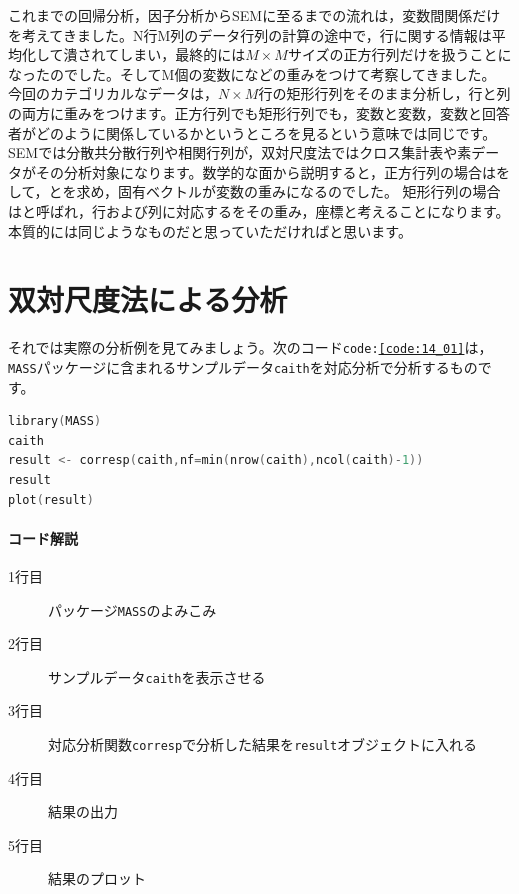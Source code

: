 \documentclass{ltjsbook}
\begin{document}
これまでの回帰分析，因子分析からSEMに至るまでの流れは，変数間関係だけを考えてきました。N行M列のデータ行列の計算の途中で，行に関する情報は平均化して潰されてしまい，最終的には$M \times M$サイズの正方行列だけを扱うことになったのでした。そしてM個の変数になどの重みをつけて考察してきました。
今回のカテゴリカルなデータは，$N\times M$行の矩形行列をそのまま分析し，行と列の両方に重みをつけます。正方行列でも矩形行列でも，変数と変数，変数と回答者がどのように関係しているかというところを見るという意味では同じです。SEMでは分散共分散行列や相関行列が，双対尺度法ではクロス集計表や素データがその分析対象になります。数学的な面から説明すると，正方行列の場合はをして，とを求め，固有ベクトルが変数の重みになるのでした。
矩形行列の場合はと呼ばれ，行および列に対応するをその重み，座標と考えることになります。本質的には同じようなものだと思っていただければと思います。

\section{双対尺度法による分析}
それでは実際の分析例を見てみましょう。次のコード\texttt{code:\ref{code:14_01}}は，\texttt{MASS}パッケージに含まれるサンプルデータ\texttt{caith}を対応分析で分析するものです。

\begin{lstlisting}[language=c++,label={code:14_01},caption={双対尺度法による分析}]
library(MASS)
caith
result <- corresp(caith,nf=min(nrow(caith),ncol(caith)-1))
result
plot(result)
\end{lstlisting}

\paragraph{コード解説}
\begin{description}
    \item[1行目] パッケージ\texttt{MASS}のよみこみ
    \item[2行目] サンプルデータ\texttt{caith}を表示させる
    \item[3行目] 対応分析関数\texttt{corresp}で分析した結果を\texttt{result}オブジェクトに入れる
    \item[4行目] 結果の出力
    \item[5行目] 結果のプロット
\end{description}
\end{document}
